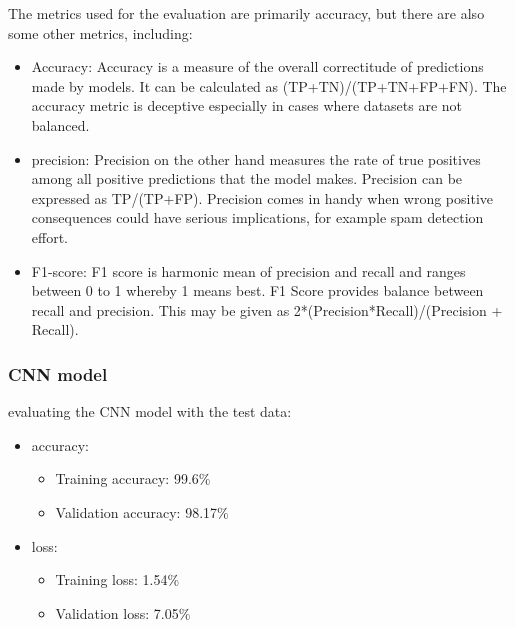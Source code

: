 The metrics used for the evaluation are primarily accuracy, but there are also some other metrics, including:
\begin{itemize}
	\item Accuracy: Accuracy is a measure of the overall correctitude of predictions made by models. It can be calculated as (TP+TN)/(TP+TN+FP+FN). The accuracy metric is deceptive especially in cases where datasets are not balanced.
	\item precision: Precision on the other hand measures the rate of true positives among all positive predictions that the model makes. Precision can be expressed as TP/(TP+FP). Precision comes in handy when wrong positive consequences could have serious implications, for example spam detection effort.
	\item F1-score: F1 score is harmonic mean of precision and recall and ranges between 0 to 1 whereby 1 means best. F1 Score provides balance between recall and precision. This may be given as 2*(Precision*Recall)/(Precision + Recall).
\end{itemize}












\subsubsection{CNN model}
evaluating the CNN model with the test data:
\firmlist
		\begin{itemize}
			\item accuracy:
				\begin{itemize}
					\item Training accuracy: 99.6\%
					\item Validation accuracy: 98.17\%
				\end{itemize}
			\item loss:
				\begin{itemize}
					\item Training loss: 1.54\%
					\item Validation loss: 7.05\%
				\end{itemize}
		\end{itemize}


